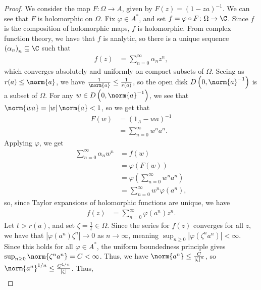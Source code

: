 \documentclass[10pt]{mypackage}
\begin{document}
\begin{proof}
  We consider the map $F\colon \Omega\rightarrow A$, given by $F(z) = \left(1-za\right)^{-1}$. We can see that $F$ is holomorphic on $\Omega$. Fix $\varphi\in A^{\ast}$, and set $f = \varphi\circ F\colon \Omega\rightarrow \C$. Since $f$ is the composition of holomorphic maps, $f$ is holomorphic. From complex function theory, we have that $f$ is analytic, so there is a unique sequence $\left(\alpha_n\right)_n\subseteq \C$ such that
  \begin{align*}
    f(z) &= \sum_{n=0}^{\infty}\alpha_nz^n,
  \end{align*}
  which converges absolutely and uniformly on compact subsets of $\Omega$. Seeing as $r(a)\leq \norm{a}$, we have $\frac{1}{\norm{a}} \leq \frac{1}{r(a)}$, so the open disk $D\left(0,\norm{a}^{-1}\right)$ is a subset of $\Omega$. For any $w\in D\left(0,\norm{a}^{-1}\right)$, we see that $\norm{wa} = \left\vert w \right\vert\norm{a} < 1$, so we get that
  \begin{align*}
    F(w) &= \left(1_A - wa\right)^{-1}\\
         &= \sum_{n=0}^{\infty}w^na^n.
  \end{align*}
  Applying $\varphi$, we get
  \begin{align*}
    \sum_{n=0}^{\infty}\alpha_nw^n &= f(w)\\
                                   &= \varphi\left(F(w)\right)\\
                                   &= \varphi\left(\sum_{n=0}^{\infty}w^na^n\right)\\
                                   &= \sum_{n=0}^{\infty}w^n\varphi\left(a^n\right),
  \end{align*}
  so, since Taylor expansions of holomorphic functions are unique, we have
  \begin{align*}
    f(z) &= \sum_{n=0}^{\infty}\varphi\left(a^n\right)z^n.
  \end{align*}
  Let $t > r(a)$, and set $\zeta = \frac{1}{t}\in \Omega$. Since the series for $f(z)$ converges for all $z$, we have that $\left\vert \varphi\left(a^n\right)\zeta^n \right\vert \rightarrow 0$ as $n\rightarrow\infty$, meaning $\sup_{n\geq 0}\left\vert \varphi\left(\zeta^na^n\right) \right\vert < \infty$. Since this holds for all $\varphi\in A^{\ast}$, the uniform boundedness principle gives $\sup_{n\geq 0}\norm{\zeta^na^n} = C < \infty$. Thus, we have $\norm{a^n} \leq \frac{C}{\left\vert \zeta \right\vert^n}$, so $\norm{a^n}^{1/n} \leq \frac{C^{1/n}}{\left\vert \zeta \right\vert}$. Thus,
  \begin{align*}

\end{align*}
\end{proof}
\end{document}
